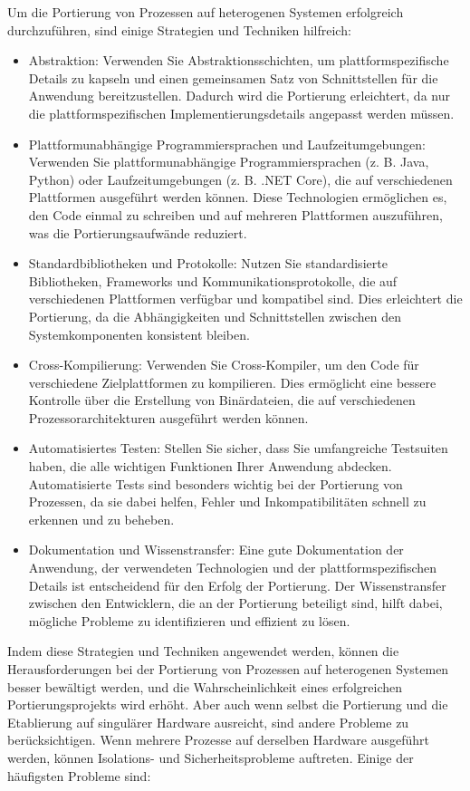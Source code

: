 Um die Portierung von Prozessen auf heterogenen Systemen erfolgreich durchzuführen, sind einige Strategien und Techniken hilfreich:
\begin{itemize}
\item Abstraktion: Verwenden Sie Abstraktionsschichten, um plattformspezifische Details zu kapseln und einen gemeinsamen Satz von Schnittstellen für die Anwendung bereitzustellen. Dadurch wird die Portierung erleichtert, da nur die plattformspezifischen Implementierungsdetails angepasst werden müssen.
\item Plattformunabhängige Programmiersprachen und Laufzeitumgebungen: Verwenden Sie plattformunabhängige Programmiersprachen (z. B. Java, Python) oder Laufzeitumgebungen (z. B. .NET Core), die auf verschiedenen Plattformen ausgeführt werden können. Diese Technologien ermöglichen es, den Code einmal zu schreiben und auf mehreren Plattformen auszuführen, was die Portierungsaufwände reduziert.
\item Standardbibliotheken und Protokolle: Nutzen Sie standardisierte Bibliotheken, Frameworks und Kommunikationsprotokolle, die auf verschiedenen Plattformen verfügbar und kompatibel sind. Dies erleichtert die Portierung, da die Abhängigkeiten und Schnittstellen zwischen den Systemkomponenten konsistent bleiben.
\item Cross-Kompilierung: Verwenden Sie Cross-Kompiler, um den Code für verschiedene Zielplattformen zu kompilieren. Dies ermöglicht eine bessere Kontrolle über die Erstellung von Binärdateien, die auf verschiedenen Prozessorarchitekturen ausgeführt werden können.
\item Automatisiertes Testen: Stellen Sie sicher, dass Sie umfangreiche Testsuiten haben, die alle wichtigen Funktionen Ihrer Anwendung abdecken. Automatisierte Tests sind besonders wichtig bei der Portierung von Prozessen, da sie dabei helfen, Fehler und Inkompatibilitäten schnell zu erkennen und zu beheben.
\item Dokumentation und Wissenstransfer: Eine gute Dokumentation der Anwendung, der verwendeten Technologien und der plattformspezifischen Details ist entscheidend für den Erfolg der Portierung. Der Wissenstransfer zwischen den Entwicklern, die an der Portierung beteiligt sind, hilft dabei, mögliche Probleme zu identifizieren und effizient zu lösen.
\end{itemize}
Indem diese Strategien und Techniken angewendet werden, können die Herausforderungen bei der Portierung von Prozessen auf heterogenen Systemen besser bewältigt werden, und die Wahrscheinlichkeit eines erfolgreichen Portierungsprojekts wird erhöht. Aber auch wenn selbst die Portierung und die Etablierung auf singulärer Hardware ausreicht, sind andere Probleme zu berücksichtigen. Wenn mehrere Prozesse auf derselben Hardware ausgeführt werden, können Isolations- und Sicherheitsprobleme auftreten. Einige der häufigsten Probleme sind:
